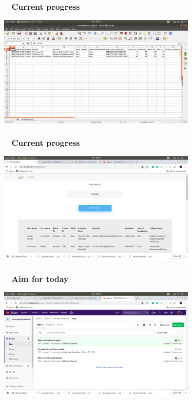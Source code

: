 \documentclass{beamer}
\begin{document}
\begin{frame}
\frametitle{ ~ Current progress}
\begin{center}
\includegraphics[width = 10cm]{5.png}
\end{center}
\end{frame}

\begin{frame}
\frametitle{ ~ Current progress}
\begin{center}
\includegraphics[width = 10cm]{6.png}
\end{center}
\end{frame}


\begin{frame}
\frametitle{ ~ Aim for today}
\begin{center}
\includegraphics[width = 10cm]{7.png}
\end{center}
\end{frame}
\end{document}
